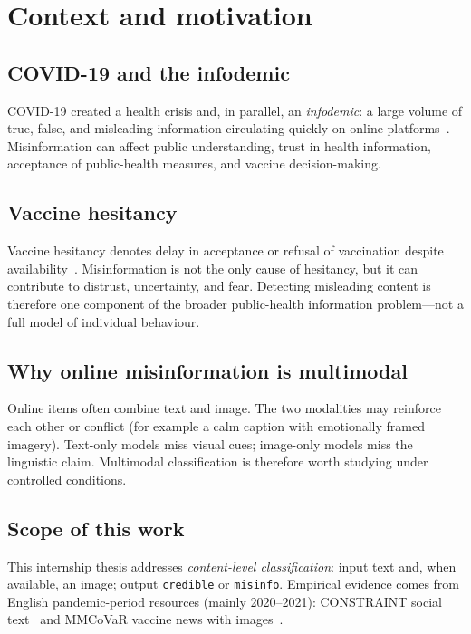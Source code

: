 \documentclass[12pt, a4paper]{report}
\begin{document}
\section{Context and motivation}
\label{sec:context}

\subsection{COVID-19 and the infodemic}

COVID-19 created a health crisis and, in parallel, an \emph{infodemic}: a large volume of true, false, and misleading information circulating quickly on online platforms~\cite{who2020infodemic}.
Misinformation can affect public understanding, trust in health information, acceptance of public-health measures, and vaccine decision-making.

\subsection{Vaccine hesitancy}

Vaccine hesitancy denotes delay in acceptance or refusal of vaccination despite availability~\cite{macdonald2015hesitancy}.
Misinformation is not the only cause of hesitancy, but it can contribute to distrust, uncertainty, and fear.
Detecting misleading content is therefore one component of the broader public-health information problem---not a full model of individual behaviour.

\subsection{Why online misinformation is multimodal}

Online items often combine text and image.
The two modalities may reinforce each other or conflict (for example a calm caption with emotionally framed imagery).
Text-only models miss visual cues; image-only models miss the linguistic claim.
Multimodal classification is therefore worth studying under controlled conditions.

\subsection{Scope of this work}

This internship thesis addresses \emph{content-level classification}:
input text and, when available, an image; output \texttt{credible} or \texttt{misinfo}.
Empirical evidence comes from English pandemic-period resources (mainly 2020--2021): CONSTRAINT social text~\cite{patwa2021fighting} and MMCoVaR vaccine news with images~\cite{chen2021mmcovar}.
\end{document}
